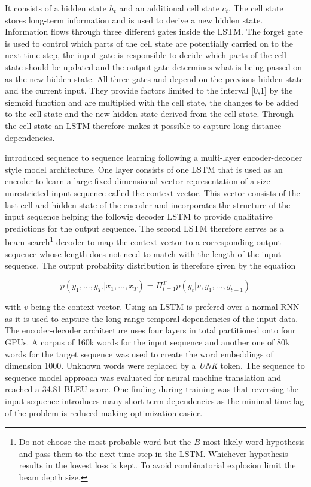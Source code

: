 It consists of a hidden state $h_t$ and an additional cell state $c_t$. The cell state stores long-term information and is used to derive a new hidden state. Information flows through three different gates inside the \ac{LSTM}. The forget gate is used to control which parts of the cell state are potentially carried on to the next time step, the input gate is responsible to decide which parts of the cell state should be updated and the output gate determines what is being passed on as the new hidden state. All three gates and depend on the previous hidden state and the current input. They provide factors limited to the interval [0,1] by the sigmoid function and are multiplied with the cell state, the changes to be added to the cell state and the new hidden state derived from the cell state. Through the cell state an \ac{LSTM} therefore makes it possible to capture long-distance dependencies. \cite{Gertz2020}

\cite{Sutskever2014} introduced sequence to sequence learning following a multi-layer encoder-decoder style model architecture. One layer consists of one \ac{LSTM} that is used as an encoder to learn a large fixed-dimensional vector representation of a size-unrestricted input sequence called the context vector. This vector consists of the last cell and hidden state of the encoder and incorporates the structure of the input sequence helping the followig decoder \ac{LSTM} to provide qualitative predictions for the output sequence. The second \ac{LSTM} therefore serves as a beam search\footnote{Do not choose the most probable word but the $B$ most likely word hypothesis and pass them to the next time step in the \ac{LSTM}. Whichever hypothesis results in the lowest loss is kept. To avoid combinatorial explosion limit the beam depth size.} decoder to map the context vector to a corresponding output sequence whose length does not need to match with the length of the input sequence. The output probabiity distribution is therefore given by the equation

\begin{equation}
	p(y_1, ..., y_{T'} | x_1, ..., x_{T}) = \Pi_{t=1}^{T'} p(y_t | v, y_1, ..., y_{t-1})
\end{equation}

with $v$ being the context vector. Using an \ac{LSTM} is prefered over a normal \ac{RNN} as it is used to capture the long range temporal dependencies of the input data. The encoder-decoder architecture uses four layers in total partitioned onto four \acp{GPU}. A corpus of 160k words for the input sequence and another one of 80k words for the target sequence was used to create the word embeddings of dimension 1000. Unknown words were replaced by a \textit{UNK} token. The sequence to sequence model approach was evaluated for neural machine translation and reached a 34.81 BLEU score. One finding during training was that reversing the input sequence introduces many short term dependencies as the minimal time lag of the problem is reduced making optimization easier. \cite{Sutskever2014}

